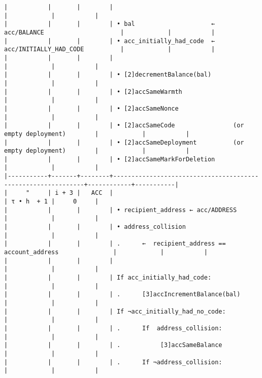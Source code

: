 \documentclass[varwidth=\maxdimen,margin=0.5cm,multi={verbatim}]{standalone}
\begin{document}
\begin{verbatim}
|           |       |        |                                                              |            |           |
|           |       |        | • bal                     ←  acc/BALANCE                     |            |           |
|           |       |        | • acc_initially_had_code  ←  acc/INITIALLY_HAD_CODE          |            |           |
|           |       |        |                                                              |            |           |
|           |       |        | • [2]decrementBalance(bal)                                   |            |           |
|           |       |        | • [2]accSameWarmth                                           |            |           |
|           |       |        | • [2]accSameNonce                                            |            |           |
|           |       |        | • [2]accSameCode                (or empty deployment)        |            |           |
|           |       |        | • [2]accSameDeployment          (or empty deployment)        |            |           |
|           |       |        | • [2]accSameMarkForDeletion                                  |            |           |
|-----------+-------+--------+--------------------------------------------------------------+------------+-----------|
|     "     | i + 3 |   ACC  |                                                              | τ • h  + 1 |     0     |
|           |       |        | • recipient_address ← acc/ADDRESS                            |            |           |
|           |       |        | • address_collision                                          |            |           |
|           |       |        | .      ←  recipient_address == account_address               |            |           |
|           |       |        |                                                              |            |           |
|           |       |        | If acc_initially_had_code:                                   |            |           |
|           |       |        | .      [3]accIncrementBalance(bal)                           |            |           |
|           |       |        | If ¬acc_initially_had_no_code:                               |            |           |
|           |       |        | .      If  address_collision:                                |            |           |
|           |       |        | .           [3]accSameBalance                                |            |           |
|           |       |        | .      If ¬address_collision:                                |            |           |

\end{verbatim}
\end{document}
